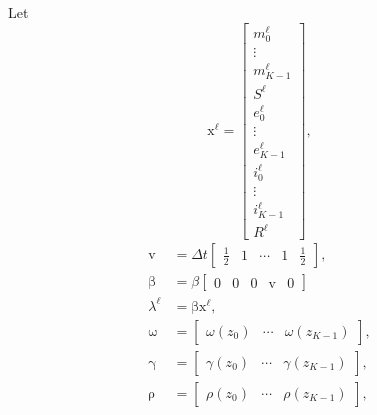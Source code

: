 \documentclass{jpmarticle}
\renewcommand{\vec}[1]{\boldsymbol{\mathrm{#1}}}
\begin{document}
Let
\begin{equation}
  \vec{x}^{\ell} =
  \begin{bmatrix}
    m_0^{\ell} \\ \vdots \\ m_{K - 1}^{\ell} \\
    S^{\ell} \\
    e_0^{\ell} \\ \vdots \\ e_{K - 1}^{\ell} \\
    i_0^{\ell} \\ \vdots \\ i_{K - 1}^{\ell} \\
    R^{\ell}
  \end{bmatrix},
\end{equation}
\begin{equation}
  \begin{split}
    \vec{v} &=
    \Delta t
    \begin{bmatrix}
      \frac{1}{2} & 1 & \cdots & 1 & \frac{1}{2}
    \end{bmatrix},
    \\
    \vec{\beta} &=
    \beta
    \begin{bmatrix}
      \vec{0} & 0 & \vec{0} & \vec{v} & 0
    \end{bmatrix}
    \\
    \lambda^{\ell} &=
    \vec{\beta} \vec{x}^{\ell},
    \\
    \vec{\omega} &=
    \begin{bmatrix}
      \omega(z_0) & \cdots & \omega(z_{K - 1})
    \end{bmatrix},
    \\
    \vec{\gamma} &=
    \begin{bmatrix}
      \gamma(z_0) & \cdots & \gamma(z_{K - 1})
    \end{bmatrix},
    \\
    \vec{\rho} &=
    \begin{bmatrix}
      \rho(z_0) & \cdots & \rho(z_{K - 1})
    \end{bmatrix},
  \end{split}
\end{equation}
\end{document}
